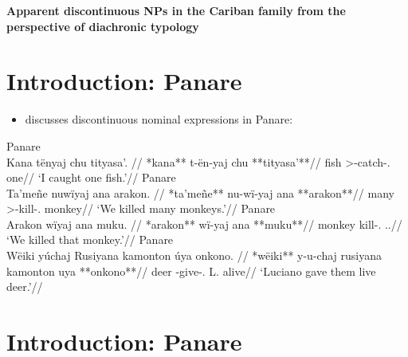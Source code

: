 \documentclass[10pt]{article}
\begin{document}
\begin{center}
\Large \bfseries {Apparent discontinuous NPs in the Cariban family from the perspective of diachronic typology}
\end{center}

\section{Introduction: Panare}

\begin{itemize}
\tightlist
\item
  \textcites{payne1993nonconfigurationality} discusses discontinuous
  nominal expressions in Panare:
\end{itemize}

\pex\label{}    \a Panare\\
    \label{pan-0}        \begingl
        \glpreamble Kana tënyaj chu tityasa’. //
        \gla **kana** t-ën-yaj chu **tityasa’**//
        \glb fish >-catch-.  one//
            \glft ‘I caught one fish.’//  
        \endgl 
    \a Panare\\
    \label{pan-1}        \begingl
        \glpreamble Ta’meñe nuwïyaj ana arakon. //
        \gla **ta’meñe** nu-wï-yaj ana **arakon**//
        \glb many >-kill-.  monkey//
            \glft ‘We killed many monkeys.’//  
        \endgl 
    \a Panare\\
    \label{pan-2}        \begingl
        \glpreamble Arakon wïyaj ana muku. //
        \gla **arakon** wï-yaj ana **muku**//
        \glb monkey kill-.  ..//
            \glft ‘We killed that monkey.’//  
        \endgl 
    \a Panare\\
    \label{pan-3}        \begingl
        \glpreamble Wëiki yúchaj Rusiyana kamonton úya onkono. //
        \gla **wëiki** y-u-chaj rusiyana kamonton uya **onkono**//
        \glb deer -give-. L.   alive//
            \glft ‘Luciano gave them live deer.’//  
        \endgl 
\xe

\section{Introduction: Panare}
\end{document}
